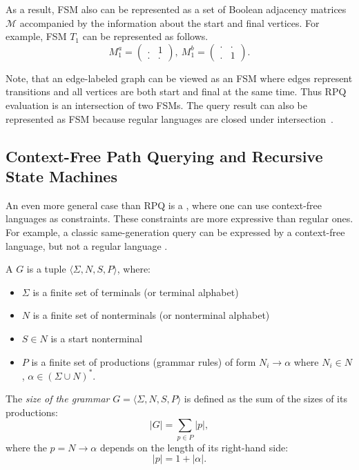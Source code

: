 As a result, FSM also can be represented as a set of Boolean adjacency matrices $\mathcal{M}$ accompanied by the information about the start and final vertices.
For example, FSM $T_1$ can be represented as follows.
$$
M_1^a =
\begin{pmatrix}
.&1 \\
.&.
\end{pmatrix},~
M_1^b =
\begin{pmatrix}
.&. \\
.&1
\end{pmatrix}.
$$

Note, that an edge-labeled graph can be viewed as an FSM where edges represent transitions and all vertices are both start and final at the same time.
Thus RPQ evaluation is an intersection of two FSMs.
The query result can also be represented as FSM because regular languages are closed under intersection~\cite{automata:theory:10.5555/1177300}.

\subsection{Context-Free Path Querying and Recursive State Machines}

An even more general case than RPQ is a , where one can use context-free languages as constraints.
These constraints are more expressive than regular ones.
For example, a classic same-generation query can be expressed by a context-free language, but not a regular language \cite{databasebook}.

\begin{definition}
A  $G$ is a tuple $\langle\Sigma, N, S, P\rangle$, where:
\begin{itemize}
    \item $\Sigma$ is a finite set of terminals (or terminal alphabet)
    \item $N$ is a finite set of nonterminals (or nonterminal alphabet)
    \item $S \in N$ is a start nonterminal
    \item $P$ is a finite set of productions (grammar rules) of form $N_i \to \alpha$ where  $N_i \in N$, $\alpha \in (\Sigma \cup N)^*$.
\end{itemize}
\end{definition}

\begin{definition}

    The \emph{size of the grammar} $G = \langle \Sigma, N, S, P \rangle$ is defined as the sum of the sizes of its productions:
    \[|G| = \sum_{p \in P} |p|,\]
    where the  $p = N \to \alpha$ depends on the length of its right-hand side:
    \[|p| = 1 + |\alpha|.\]

\end{definition}

